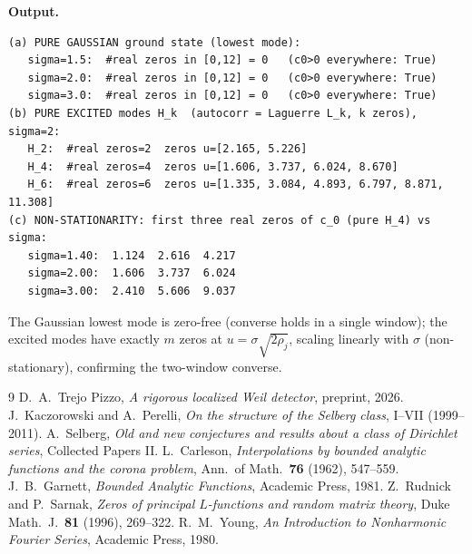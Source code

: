 \documentclass[11pt]{amsart}
\theoremstyle{definition}
\theoremstyle{remark}
\begin{document}


\medskip\noindent\textbf{Output.}
\begin{lstlisting}
(a) PURE GAUSSIAN ground state (lowest mode):
   sigma=1.5:  #real zeros in [0,12] = 0   (c0>0 everywhere: True)
   sigma=2.0:  #real zeros in [0,12] = 0   (c0>0 everywhere: True)
   sigma=3.0:  #real zeros in [0,12] = 0   (c0>0 everywhere: True)
(b) PURE EXCITED modes H_k  (autocorr = Laguerre L_k, k zeros), sigma=2:
   H_2:  #real zeros=2  zeros u=[2.165, 5.226]
   H_4:  #real zeros=4  zeros u=[1.606, 3.737, 6.024, 8.670]
   H_6:  #real zeros=6  zeros u=[1.335, 3.084, 4.893, 6.797, 8.871, 11.308]
(c) NON-STATIONARITY: first three real zeros of c_0 (pure H_4) vs sigma:
   sigma=1.40:  1.124  2.616  4.217
   sigma=2.00:  1.606  3.737  6.024
   sigma=3.00:  2.410  5.606  9.037
\end{lstlisting}
The Gaussian lowest mode is zero-free (converse holds in a single window); the
excited modes have exactly $m$ zeros at $u=\sigma\sqrt{2\rho_j}$, scaling linearly
with $\sigma$ (non-stationary), confirming the two-window converse.

\begin{thebibliography}{9}
 D.~A.~Trejo Pizzo, \emph{A rigorous localized Weil detector}, preprint, 2026.
 J.~Kaczorowski and A.~Perelli, \emph{On the structure of the Selberg class}, I--VII (1999--2011).
 A.~Selberg, \emph{Old and new conjectures and results about a class of Dirichlet series}, Collected Papers II.
 L.~Carleson, \emph{Interpolations by bounded analytic functions and the corona problem}, Ann.\ of Math.\ \textbf{76} (1962), 547--559.
 J.~B.~Garnett, \emph{Bounded Analytic Functions}, Academic Press, 1981.
 Z.~Rudnick and P.~Sarnak, \emph{Zeros of principal $L$-functions and random matrix theory}, Duke Math.\ J.\ \textbf{81} (1996), 269--322.
 R.~M.~Young, \emph{An Introduction to Nonharmonic Fourier Series}, Academic Press, 1980.
\end{thebibliography}
\end{document}
